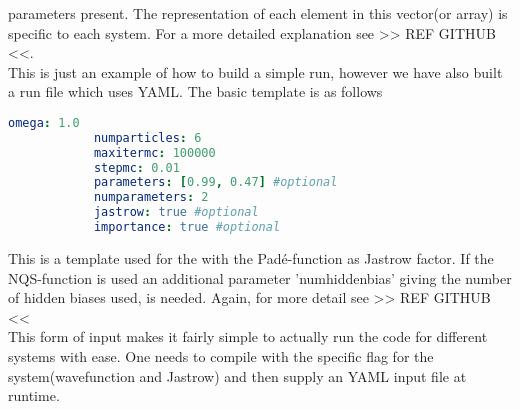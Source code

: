     parameters present. The representation of each element in this vector(or
    array) is specific to each system. For a more detailed explanation see >>
    REF GITHUB <<. \\
    This is just an example of how to build a simple run, however we have also
    built a run file which uses YAML\cite{yaml}. The basic template is as
    follows
        \begin{lstlisting}[language=yaml]
            omega: 1.0
            numparticles: 6
            maxitermc: 100000
            stepmc: 0.01
            parameters: [0.99, 0.47] #optional
            numparameters: 2
            jastrow: true #optional
            importance: true #optional
        \end{lstlisting}
    This is a template used for the  with the
    Pad\'e-function as Jastrow factor. If the NQS-function is used an
    additional parameter 'numhiddenbias' giving the number of hidden biases
    used, is needed. Again, for more detail see >> REF GITHUB << \\ 
    This form of input makes it fairly simple to actually run the code for
    different systems with ease. One needs to compile with the specific flag
    for the system(wavefunction and Jastrow) and then supply an YAML input file
    at runtime.

